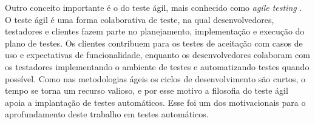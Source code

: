 Outro conceito importante é o do teste ágil, mais conhecido como \emph{agile testing} \cite{myers}. O teste ágil é uma forma colaborativa de teste, na qual desenvolvedores, testadores e clientes fazem parte no planejamento, implementação e execução do plano de testes. Os clientes contribuem para os testes de aceitação com casos de uso e expectativas de funcionalidade, enquanto os desenvolvedores colaboram com os testadores implementando o ambiente de testes e automatizando testes quando possível. Como nas metodologias ágeis os ciclos de desenvolvimento são curtos, o tempo se torna um recurso valioso, e por esse motivo a filosofia do teste ágil apoia a implantação de testes automáticos. Esse foi um dos motivacionais para o aprofundamento deste trabalho em testes automáticos.